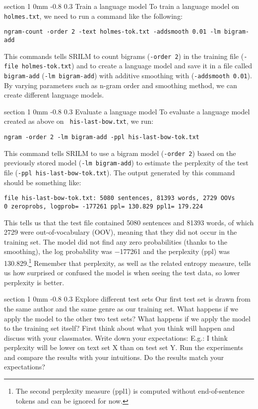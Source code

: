 \documentclass[11pt]{article}
\makeatletter
\newcommand{\newsec}[2]{\section{#1}\label{sec:#2}\noindent}
\renewcommand{\section}{\@startsection
{section}%
{1}%
{0mm}%
{-0.8\baselineskip}%
{0.3\baselineskip}%
{\bfseries\large}}%
\makeatother
\begin{document}
\newsec{Train a language model}{train}%
To train a language model on {\tt holmes.txt}, we need to run a
command like the following:
\begin{verbatim}
ngram-count -order 2 -text holmes-tok.txt -addsmooth 0.01 -lm bigram-add
\end{verbatim}
This commands tells SRILM to count bigrams ({\tt -order~2}) in the training file ({\tt -file~holmes-tok.txt})
and to create a language model and save it in a file called {\tt bigram-add} ({\tt -lm~bigram-add}) with additive smoothing with ({\tt -addsmooth~0.01}).
By varying parameters such as n-gram order and smoothing method, we can create different language models.

\newsec{Evaluate a language model}{eval}%
To evaluate a language model created as above on {\tt
  his-last-bow.txt}, we run:
\begin{verbatim}
ngram -order 2 -lm bigram-add -ppl his-last-bow-tok.txt
\end{verbatim}
This command tells SRILM to use a bigram model ({\tt -order~2}) based
on the previously stored model ({\tt -lm~bigram-add}) to estimate the
perplexity of the test file ({\tt -ppl~his-last-bow-tok.txt}). The
output generated by this command should be something like:
\begin{verbatim}
file his-last-bow-tok.txt: 5080 sentences, 81393 words, 2729 OOVs
0 zeroprobs, logprob= -177261 ppl= 130.829 ppl1= 179.224
\end{verbatim}
This tells us that the test file contained 5080 sentences and 81393
words, of which 2729 were out-of-vocabulary (OOV), meaning that they
did not occur in the training set. The model did not find any zero
probabilities (thanks to the smoothing), the log probability was
$-$177261 and the perplexity (ppl) was 130.829.\footnote{The second
  perplexity measure (ppl1) is computed without end-of-sentence tokens
  and can be ignored for now.} Remember that perplexity, as well as
the related entropy measure, tells us how surprised or confused the
model is when seeing the test data, so lower perplexity is better.

\newsec{Explore different test sets }{sets}%
Our first test set is drawn from the same author and the same genre as
our training set. What happens if we apply the model to the other two
test sets? What happens if we apply the model to the training set
itself? First think about what you think will happen and discuss with your
classmates. Write down your expectations: E.g.: I think perplexity will be
lower on text set X than on test set Y.
Run the experiments and compare the results with your intuitions. Do the
results match your expectations? 
\end{document}
